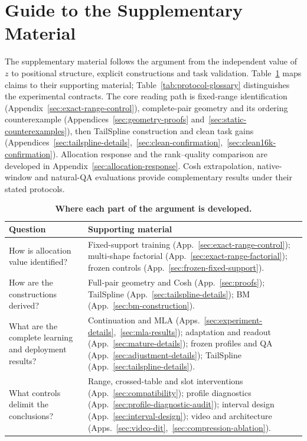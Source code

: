 \section*{Guide to the Supplementary Material}
The supplementary material follows the argument from the independent value of $z$ to positional structure, explicit constructions and task validation. Table~\ref{tab:argument-guide} maps claims to their supporting material; Table~\ref{tab:protocol-glossary} distinguishes the experimental contracts.
The core reading path is fixed-range identification (Appendix~\ref{sec:exact-range-control}), complete-pair geometry and its ordering counterexample (Appendices~\ref{sec:geometry-proofs} and~\ref{sec:static-counterexamples}), then TailSpline construction and clean task gains (Appendices~\ref{sec:tailspline-details},~\ref{sec:clean-confirmation},~\ref{sec:clean16k-confirmation}). Allocation response and the rank--quality comparison are developed in Appendix~\ref{sec:allocation-response}. Cosh extrapolation, native-window and natural-QA evaluations provide complementary results under their stated protocols.
\begin{table}[ht]
\centering\small
\caption{\textbf{Where each part of the argument is developed.}}
\label{tab:argument-guide}
\begin{tabular}{@{}>{\raggedright\arraybackslash}p{.36\linewidth}>{\raggedright\arraybackslash}p{.59\linewidth}@{}}
\toprule
Question & Supporting material \\
\midrule
How is allocation value identified? & Fixed-support training (App.~\ref{sec:exact-range-control}); multi-shape factorial (App.~\ref{sec:exact-range-factorial}); frozen controls (App.~\ref{sec:frozen-fixed-support}). \\
How are the constructions derived? & Full-pair geometry and Cosh (App.~\ref{sec:proofs}); TailSpline (App.~\ref{sec:tailspline-details}); BM (App.~\ref{sec:bm-construction}). \\
What are the complete learning and deployment results? & Continuation and MLA (Apps.~\ref{sec:experiment-details},~\ref{sec:mla-results}); adaptation and readout (App.~\ref{sec:mature-details}); frozen profiles and QA (App.~\ref{sec:adjustment-details}); TailSpline (App.~\ref{sec:tailspline-details}). \\
What controls delimit the conclusions? & Range, crossed-table and slot interventions (App.~\ref{sec:compatibility}); profile diagnostics (App.~\ref{sec:profile-diagnostic-audit}); interval design (App.~\ref{sec:interval-design}); video and architecture (Apps.~\ref{sec:video-dit},~\ref{sec:compression-ablation}). \\
\bottomrule
\end{tabular}
\end{table}
\FloatBarrier

